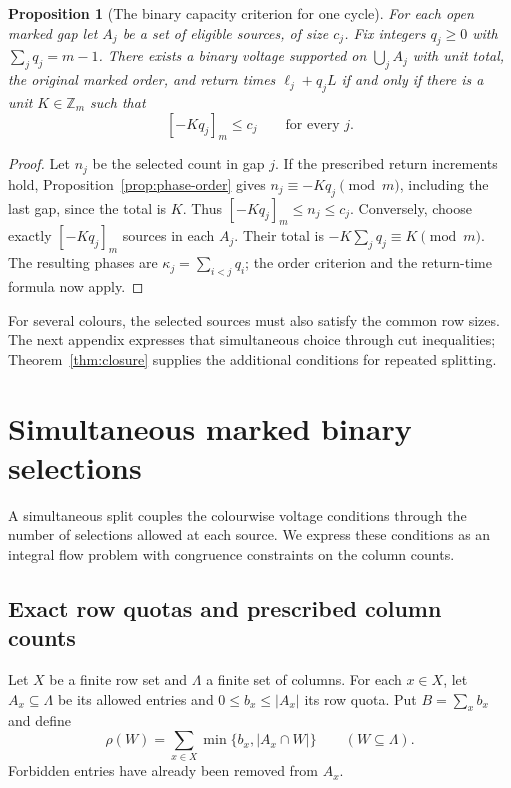 \documentclass[11pt,reqno]{amsart}
\numberwithin{equation}{section}
\newtheorem{proposition}[theorem]{Proposition}
\theoremstyle{definition}
\theoremstyle{remark}
\newcommand{\Zm}{\mathbb Z_m}
\begin{document}
\begin{proposition}[The binary capacity criterion for one cycle]\label{prop:binary-capacity}
For each open marked gap let $A_j$ be a set of eligible sources, of size
$c_j$. Fix integers $q_j\ge0$ with $\sum_jq_j=m-1$.
There exists a binary voltage supported on $\bigcup_jA_j$ with unit total,
the original marked order, and return times $\ell_j+q_jL$ if and only if there
is a unit $K\in\Zm$ such that
\begin{equation}\label{eq:binary-capacity}
 [-Kq_j]_m\le c_j\qquad\text{for every }j.
\end{equation}
\end{proposition}
\begin{proof}
Let $n_j$ be the selected count in gap $j$. If the prescribed return
increments hold, Proposition~\ref{prop:phase-order} gives
$n_j\equiv-Kq_j\pmod m$, including the last gap, since the total is $K$.
Thus $[-Kq_j]_m\le n_j\le c_j$.
Conversely, choose exactly $[-Kq_j]_m$ sources in each $A_j$.
Their total is $-K\sum_jq_j\equiv K\pmod m$.
The resulting phases are $\kappa_j=\sum_{i<j}q_i$; the order criterion
and the return-time formula now apply.
\end{proof}

For several colours, the selected sources must also satisfy the common
row sizes. The next appendix expresses that simultaneous choice through
cut inequalities; Theorem~\ref{thm:closure} supplies the additional
conditions for repeated splitting.


\section{Simultaneous marked binary selections}\label{app:coupled}
A simultaneous split couples the colourwise voltage conditions through
the number of selections allowed at each source. We express these
conditions as an integral flow problem with congruence constraints on
the column counts.

\subsection{Exact row quotas and prescribed column counts}
Let $X$ be a finite row set and $\Lambda$ a finite set of columns.
For each $x\in X$, let $A_x\subseteq\Lambda$ be its allowed entries and
$0\le b_x\le |A_x|$ its row quota. Put $B=\sum_xb_x$ and define
\[
 \rho(W)=\sum_{x\in X}\min\{b_x,|A_x\cap W|\}
 \qquad(W\subseteq\Lambda).
\]
Forbidden entries have already been removed from $A_x$.
\end{document}
